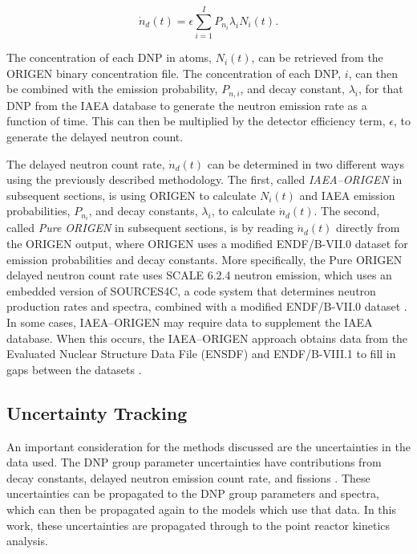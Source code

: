 \documentclass{style/nseJournal}
\begin{document}
\begin{equation}
\dot{n}_d(t) = \epsilon \sum_{i=1}^{I} P_{n_i} \lambda_i N_{i}(t).
\label{eq:ndiaea}
\end{equation}

The concentration of each DNP in atoms, $N_{i}(t)$, can be retrieved from the ORIGEN binary concentration file.
The concentration of each DNP, $i$, can then be combined with the emission probability, $P_{n, i}$, and decay constant, $\lambda_{i}$, for that DNP from the IAEA database to generate the neutron emission rate as a function of time.
This can then be multiplied by the detector efficiency term, $\epsilon$, to generate the delayed neutron count. 


The delayed neutron count rate, $\dot{n}_d(t)$ can be determined in two different ways using the previously described methodology.
The first, called \textit{IAEA--ORIGEN} in subsequent sections, is using ORIGEN to calculate $N_i(t)$ and IAEA emission probabilities, $P_{n_i}$, and decay constants, $\lambda_i$, to calculate $\dot{n}_d(t)$.
The second, called \textit{Pure ORIGEN} in subsequent sections, is by reading $\dot{n}_d(t)$ directly from the ORIGEN output, where ORIGEN uses a modified ENDF/B-VII.0 dataset for emission probabilities and decay constants.
More specifically, the Pure ORIGEN delayed neutron count rate uses SCALE 6.2.4 neutron emission, which uses an embedded version of SOURCES4C, a code system that determines neutron production rates and spectra, combined with a modified ENDF/B-VII.0 dataset \cite{wilson2005sources}.
In some cases, IAEA--ORIGEN may require data to supplement the IAEA database.
When this occurs, the IAEA--ORIGEN approach obtains data from the Evaluated Nuclear Structure Data File (ENSDF) and ENDF/B-VIII.1 to fill in gaps between the datasets \cite{tuli2001evaluated, BROWN20181}.


\subsection{Uncertainty Tracking}
\label{sec:uncertainties}
An important consideration for the methods discussed are the uncertainties in the data used.
The DNP group parameter uncertainties have contributions from decay constants, delayed neutron emission count rate, and fissions \cite{radaideh2019new}.
These uncertainties can be propagated to the DNP group parameters and spectra, which can then be propagated again to the models which use that data.
In this work, these uncertainties are propagated through to the point reactor kinetics analysis.
\end{document}

